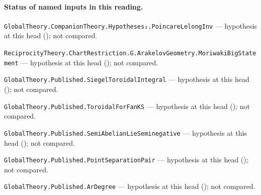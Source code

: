 

\paragraph{Status of named inputs in this reading.}
\noindent\nolinkurl{GlobalTheory.CompanionTheory.Hypotheses₂.PoincareLelongInv} --- hypothesis at this head (); not compared.\par
\noindent\nolinkurl{ReciprocityTheory.ChartRestriction.G.ArakelovGeometry.MoriwakiBigStatement} --- hypothesis at this head (); not compared.\par
\noindent\nolinkurl{GlobalTheory.Published.SiegelToroidalIntegral} --- hypothesis at this head (); not compared.\par
\noindent\nolinkurl{GlobalTheory.Published.ToroidalForFanKS} --- hypothesis at this head (); not compared.\par
\noindent\nolinkurl{GlobalTheory.Published.SemiAbelianLieSeminegative} --- hypothesis at this head (); not compared.\par
\noindent\nolinkurl{GlobalTheory.Published.PointSeparationPair} --- hypothesis at this head (); not compared.\par
\noindent\nolinkurl{GlobalTheory.Published.ArDegree} --- hypothesis at this head (); not compared.\par
